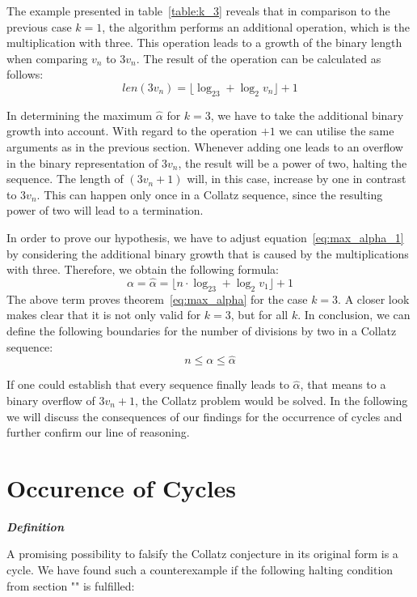 \documentclass{SciPress_2015}
\renewcommand{\subsection}[1]{\textit{\textbf{#1}}}
\begin{document}
The example presented in table~\ref{table:k_3} reveals that in comparison to the previous case $k=1$, the algorithm performs an additional operation, which is the multiplication with three. This operation leads to a growth of the binary length when comparing $v_n$ to $3v_n$. The result of the operation can be calculated as follows:
\[
	len(3v_n)=\lfloor\log_23+\log_2v_n\rfloor+1
\]

In determining the maximum $\hat\alpha$ for $k=3$, we have to take the additional binary growth into account. With regard to the operation $+1$ we can utilise the same arguments as in the previous section. Whenever adding one leads to an overflow in the binary representation of $3v_n$, the result will be a power of two, halting the sequence. The length of $(3v_{n}+1)$ will, in this case, increase by one in contrast to $3v_n$. This can happen only once in a Collatz sequence, since the resulting power of two will lead to a termination.

\par\medskip
In order to prove our hypothesis, we have to adjust equation~\ref{eq:max_alpha_1} by considering the additional binary growth that is caused by the multiplications with three. Therefore, we obtain the following formula:
\begin{equation}
\label{eq:max_alpha_k}
	\alpha=\hat\alpha=\lfloor n\cdot\log_23+\log_2v_1\rfloor+1
\end{equation}
The above term proves theorem~\ref{eq:max_alpha} for the case $k=3$. A closer look makes clear that it is not only valid for $k=3$, but for all $k$. In conclusion, we can define the following boundaries for the number of divisions by two in a Collatz sequence:
\begin{equation}
n\le\alpha\le\hat\alpha
\end{equation}

If one could establish that every sequence finally leads to $\hat\alpha$, that means to a binary overflow of $3v_n+1$, the Collatz problem would be solved. In the following we will discuss the consequences of our findings for the occurrence of cycles and further confirm our line of reasoning.

\section{Occurence of Cycles}
\subsection{Definition}
\par\noindent
A promising possibility to falsify the Collatz conjecture in its original form is a cycle. We have found such a counterexample if the following halting condition from section "" is fulfilled:
\end{document}
